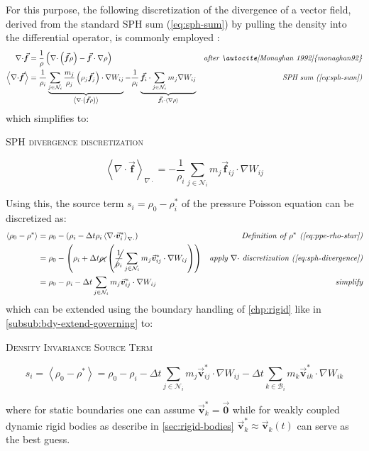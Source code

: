 \documentclass[oneside, a4paper]{book}
\newcommand{\equationnamed}[2]{%
  \setlength{\fboxsep}{2pt} %
  \setlength{\fboxrule}{0.01pt}
  \begin{center}
    \begin{minipage}{\textwidth}
      \begin{center}\textsc{#1}\end{center}
      #2
    \end{minipage}
  \end{center}
}
\newcommand\angled[1]{\left\langle#1\right\rangle}
\newcommand\vek[1]{\vec{\bm{#1}}}
\newcommand\br[1]{\left(#1\right)}
\newcommand\divergence{{\nabla\cdot}}
\begin{document}
    For this purpose, the following discretization of the divergence of a vector field, derived from the standard SPH sum (\autoref{eq:sph-sum}) by pulling the density into the differential operator, is commonly employed \autocites{monaghan92}{2014-survey-state-of-the-art-sph}: 
    \begin{align}
      \divergence \vek{f}&= \frac{1}{\rho}\br{\divergence \br{\vek{f}\rho} - \vek{f}\cdot\nabla\rho}
      &\textit{after \autocite[Monaghan 1992]{monaghan92}}\\
      \angled{\divergence \vek{f}} &= \frac{1}{\rho_i} \underbrace{\sum_{j\in\mathcal{N}_i}  \frac{m_j}{\rho_j} \br{\rho_j\vek{f}_j} \cdot \nabla W_{ij}}_{\angled{\divergence \br{\vek{f}\rho}}}
        - \frac{1}{\rho_i} \underbrace{\vek{f}_i \cdot \sum_{j\in\mathcal{N}_i}  m_j \nabla W_{ij}}_{\vek{f}_i\cdot \angled{\nabla\rho}}&\textit{SPH sum (\autoref{eq:sph-sum})}
    \end{align}
    which simplifies to:
    \equationnamed{SPH divergence discretization}{
      \begin{equation}
        \angled{\divergence \vek{f}}_{\divergence} = 
        -\frac{1}{\rho_i} \sum_{j\in\mathcal{N}_i}  
          m_j\vek{f}_{ij}\cdot\nabla W_{ij}
        \label{eq:sph-divergence}
      \end{equation}  
    }

    Using this, the source term $s_i=\rho_0-\rho^*_i$ of the pressure Poisson equation can be discretized as:
    \begin{align}
      \angled{\rho_0-\rho^*} &= \rho_0 - \br{\rho_i - \Delta t \rho_i \angled{\divergence \vek{v}^*_i}_\divergence} &\textit{Definition of $\rho^*$ (\autoref{eq:ppe-rho-star})}\\
      &= \rho_0 - \br{\rho_i + \Delta t \cancel{\rho_i} \br{\cancel{\frac{1}{\rho_i}} \sum_{j\in\mathcal{N}_i} m_j\vek{v}^*_{ij}\cdot\nabla W_{ij}}} &\textit{apply $\divergence$ discretization (\autoref{eq:sph-divergence})}\\
      &= \rho_0 - \rho_i - \Delta t \sum_{j\in\mathcal{N}_i}  m_j\vek{v}^*_{ij}\cdot\nabla W_{ij} &\textit{simplify}
    \end{align}
    which can be extended using the boundary handling of \autoref{chp:rigid} like in \autoref{subsub:bdy-extend-governing} to:
    \equationnamed{Density Invariance Source Term}{\begin{equation}
      s_i = \angled{\rho_0-\rho^*} =
      \rho_0 - \rho_i 
      - \Delta t \sum_{j\in\mathcal{N}_i}  m_j\vek{v}^*_{ij}\cdot\nabla W_{ij} 
      - \Delta t \sum_{k\in\mathcal{B}_i}  m_k\vek{v}^*_{ik}\cdot\nabla W_{ik}
      \label{eq:iisph-source-term}
    \end{equation}}
    where for static boundaries one can assume $\vek{v}^*_k=\vek{0}$ while for weakly coupled dynamic rigid bodies as describe in \autoref{sec:rigid-bodies} $\vek{v}^*_k \approx \vek{v}_k\br{t}$ can serve as the best guess. 
    
\end{document}
